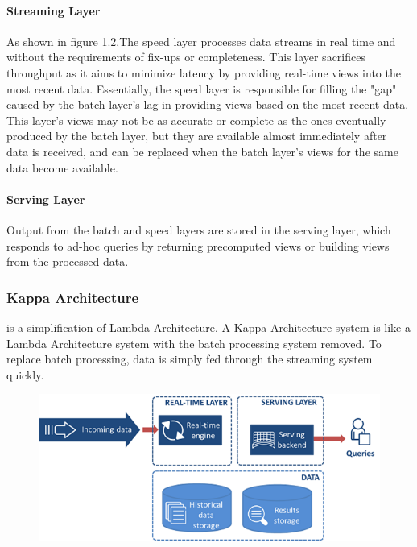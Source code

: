 \paragraph{Streaming Layer}
\label{subsec:subsec01}
As shown in figure 1.2,The speed layer processes data streams in real time and without the requirements of fix-ups or completeness. This layer sacrifices throughput as it aims 
to minimize latency by providing real-time views into the most recent data. Essentially, the speed layer is responsible for filling the "gap" caused by the 
batch layer's lag in providing views based on the most recent data. This layer's views may not be as accurate or complete as the ones eventually 
produced by the batch layer, but they are available almost immediately after data is received, and can be replaced when the batch layer's views for the 
same data become available.
\paragraph{Serving Layer}
\label{subsec:subsec01}
Output from the batch and speed layers are stored in the serving layer, which responds to ad-hoc queries by returning precomputed views or building views from the processed data.
\subsubsection{Kappa Architecture}
\label{subsec:subsec01}
is a simplification of Lambda Architecture. A Kappa Architecture system is like a Lambda Architecture system with the batch processing system removed. To replace batch processing, data is simply fed through the streaming system quickly.
\begin{figure}[h!]
	\centering
	\includegraphics[height=0.3\textheight]{fig01/kappa}
	\label{fig:FilialesEtClients}
\end{figure}

